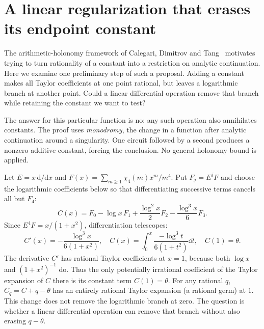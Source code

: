 \section{A linear regularization that erases its endpoint constant}\label{sec:mono}
The arithmetic-holonomy framework of Calegari, Dimitrov and
Tang~\cite{CDT} motivates trying to turn rationality of a constant into
a restriction on analytic continuation. Here we examine one preliminary
step of such a proposal. Adding a constant makes all Taylor coefficients
at one point rational, but leaves a logarithmic branch at another point.
Could a linear differential operation remove that branch while retaining
the constant we want to test?

The answer for this particular function is no: any such operation also
annihilates constants. The proof uses \emph{monodromy}, the change in a
function after analytic continuation around a singularity. One circuit
followed by a second produces a nonzero additive constant, forcing
the conclusion. No general holonomy bound is applied.

Let $E=x\,\mathrm d/\mathrm dx$ and
$F(x)=\sum_{m\geq1}\chi_4(m)x^m/m^4$. Put $F_j=E^jF$ and
choose the logarithmic coefficients below so that differentiating
successive terms cancels all but $F_4$:
\begin{equation}\label{eq:regularized}
 C(x)=F_0-\log x\,F_1+\frac{\log^2x}{2}F_2
                              -\frac{\log^3x}{6}F_3.
\end{equation}
Since $E^4F=x/(1+x^2)$, differentiation telescopes:
\[
 C'(x)=-\frac{\log^3x}{6(1+x^2)},\quad
 C(x)=\int_0^x\frac{-\log^3t}{6(1+t^2)}\dd t,\quad C(1)=\theta.
\]
The derivative $C'$ has rational Taylor coefficients at $x=1$,
because both $\log x$ and $(1+x^2)^{-1}$ do. Thus the only
potentially irrational coefficient of the Taylor expansion of $C$
there is its constant term $C(1)=\theta$. For any rational $q$,
$C_q=C+q-\theta$ has an entirely rational Taylor expansion (a
rational germ) at $1$. This change does not remove the logarithmic
branch at zero. The question is whether a linear differential
operation can remove that branch without also erasing $q-\theta$.

